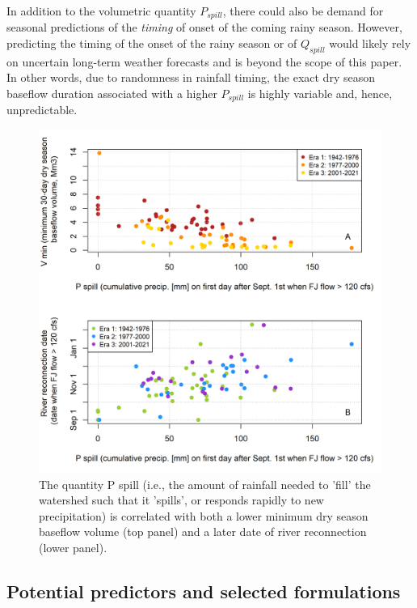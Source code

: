 \documentclass[hess, manuscript]{copernicus}
\begin{document}
In addition to the volumetric quantity \(P_{spill}\), there could also
be demand for seasonal predictions of the \emph{timing} of onset of the
coming rainy season. However, predicting the timing of the onset of the
rainy season or of \(Q_{spill}\) would likely rely on uncertain
long-term weather forecasts and is beyond the scope of this paper. In
other words, due to randomness in rainfall timing, the exact dry season
baseflow duration associated with a higher \(P_{spill}\) is highly
variable and, hence, unpredictable.

\begin{figure}
\includegraphics[width=1\linewidth]{f04} \caption{\label{fig:p_spill_vs_baseflow_and_recon_timing} The quantity P spill (i.e., the amount of rainfall needed to 'fill' the watershed such that it 'spills', or responds rapidly to new precipitation) is correlated with both a lower minimum dry season baseflow volume (top panel) and a later date of river reconnection (lower panel).}\label{fig:p_spill_vs_baseflow_and_recon_timing}
\end{figure}

\subsection{Potential predictors and selected formulations}
\end{document}
